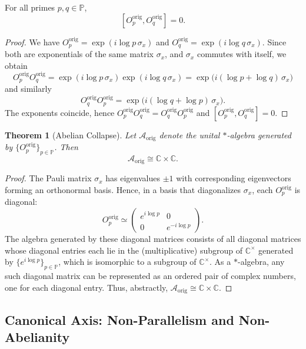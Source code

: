 \documentclass[11pt]{article}
\newtheorem{theorem}{Theorem}[section]
\theoremstyle{remark}
\begin{document}
\begin{lemma}
For all primes $p,q\in\mathbb{P}$,
\[
  [O_p^{\mathrm{orig}}, O_q^{\mathrm{orig}}] = 0.
\]
\end{lemma}

\begin{proof}
We have $O_p^{\text{orig}} = \exp(i\log p \,\sigma_x)$ and
$O_q^{\text{orig}} = \exp(i\log q \,\sigma_x)$. Since both are exponentials
of the same matrix $\sigma_x$, and $\sigma_x$ commutes with itself, we obtain
\[
  O_p^{\text{orig}} O_q^{\text{orig}}
  = \exp(i\log p \,\sigma_x) \exp(i\log q \,\sigma_x)
  = \exp\bigl(i(\log p + \log q)\,\sigma_x\bigr)
\]
and similarly
\[
  O_q^{\text{orig}} O_p^{\text{orig}}
  = \exp\bigl(i(\log q + \log p)\,\sigma_x\bigr).
\]
The exponents coincide, hence
$O_p^{\text{orig}} O_q^{\text{orig}} = O_q^{\text{orig}} O_p^{\text{orig}}$
and $[O_p^{\text{orig}}, O_q^{\text{orig}}]=0$.
\end{proof}

\begin{theorem}[Abelian Collapse]
Let $\mathcal{A}_{\mathrm{orig}}$ denote the unital $*$-algebra generated
by $\{O_p^{\mathrm{orig}}\}_{p\in\mathbb{P}}$. Then
\[
  \mathcal{A}_{\mathrm{orig}} \cong \mathbb{C} \times \mathbb{C}.
\]
\end{theorem}

\begin{proof}
The Pauli matrix $\sigma_x$ has eigenvalues $\pm 1$ with corresponding
eigenvectors forming an orthonormal basis. Hence, in a basis that diagonalizes
$\sigma_x$, each $O_p^{\text{orig}}$ is diagonal:
\[
  O_p^{\text{orig}} \simeq
  \begin{pmatrix}
    e^{i\log p} & 0 \\
    0 & e^{-i\log p}
  \end{pmatrix}.
\]
The algebra generated by these diagonal matrices consists of all diagonal
matrices whose diagonal entries each lie in the (multiplicative) subgroup of
$\mathbb{C}^\times$ generated by $\{e^{i\log p}\}_{p\in\mathbb{P}}$, which is
isomorphic to a subgroup of $\mathbb{C}^\times$. As a $*$-algebra, any such
diagonal matrix can be represented as an ordered pair of complex numbers, one
for each diagonal entry. Thus, abstractly, 
$\mathcal{A}_{\text{orig}} \cong \mathbb{C}\times\mathbb{C}$.
\end{proof}

\subsection{Canonical Axis: Non-Parallelism and Non-Abelianity}
\end{document}
